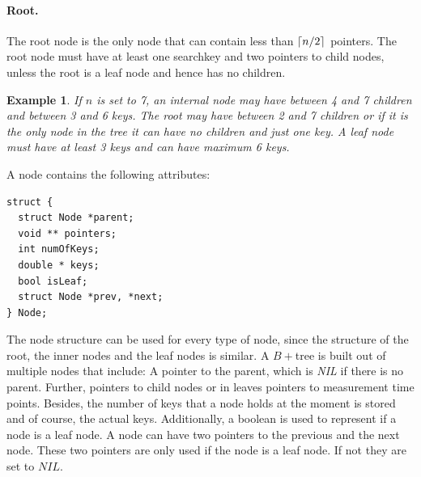 \documentclass[abstracton,12pt]{scrreprt}
\DeclarePairedDelimiter\ceil{\lceil}{\rceil}
\newtheorem{example}{Example}
\begin{document}
\paragraph{Root.}The root node is the only node that can contain less than $\ceil{n/2}$ pointers. The root node must have at least one searchkey and two pointers to child nodes, unless the root is a leaf node and hence has no children.
\begin{example}
	If $n$ is set to 7, an internal node may have between 4 and 7 children and between 3 and 6 keys. The root may have between 2 and 7 children or if it is the only node in the tree it can have no children and just one key. A leaf node must have at least 3 keys and can have maximum 6 keys.
\end{example}

A node contains the following attributes: 
\lstset{language=C}
\begin{lstlisting}
struct {
  struct Node *parent;
  void ** pointers;
  int numOfKeys;
  double * keys;
  bool isLeaf;
  struct Node *prev, *next;
} Node;
\end{lstlisting}
\BlankLine
The node structure can be used for every type of node, since the structure of the root, the inner nodes and the leaf nodes is similar. A $B+$tree is built out of multiple nodes that include: A pointer to the parent, which is \emph{NIL} if there is no parent. Further, pointers to child nodes or in leaves pointers to measurement time points. Besides, the number of keys that a node holds at the moment is stored and of course, the actual keys. Additionally, a boolean is used to represent if a node is a leaf node. A node can have two pointers to the previous and the next node. These two pointers are only used if the node is a leaf node. If not they are set to $NIL$.
\end{document}
